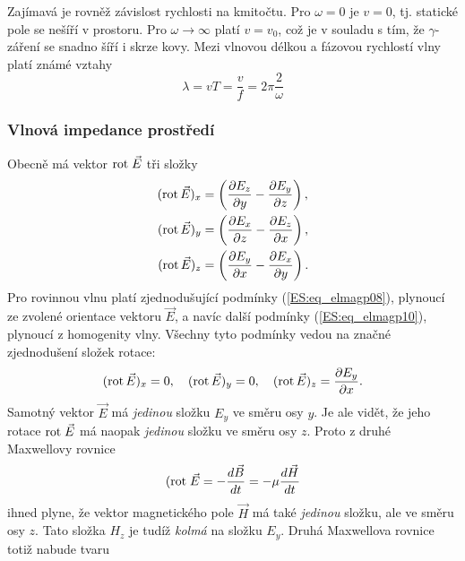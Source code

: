 {        Zajímavá je rovněž závislost rychlosti na kmitočtu. Pro \(\omega = 0\) je \(v = 0\), tj. 
        statické pole se nešíří v prostoru. Pro \(\omega\rightarrow\infty\) platí \(v = v_0\), 
        což je v souladu s tím, že \(\gamma\)-záření se snadno šíří i skrze kovy. Mezi vlnovou 
        délkou a fázovou rychlostí vlny platí známé vztahy
        \begin{equation}\label{ES:eq_elmagp21}
          \lambda = vT = \frac{v}{f} = 2\pi\frac{2}{\omega}
        \end{equation}

      \subsubsection{Vlnová impedance prostředí}
        Obecně má vektor \(\mathrm{rot}\;\vec{E}\) tři složky
        \begin{align}
          (\text{rot}\,\vec{E})_x &=\left(\dfrac{\partial E_z}{\partial y}-\dfrac{\partial E_y}{\partial z}\right), \nonumber \\
          (\text{rot}\,\vec{E})_y &=\left(\dfrac{\partial E_x}{\partial z}-\dfrac{\partial E_z}{\partial x}\right), \nonumber \\
          (\text{rot}\,\vec{E})_z &=\left(\dfrac{\partial E_y}{\partial x}-\dfrac{\partial E_x}{\partial y}\right). \label{ES:eq_elmagp22}
        \end{align}
        Pro rovinnou vlnu platí zjednodušující podmínky (\ref{ES:eq_elmagp08}), plynoucí ze zvolené 
        orientace vektoru \(\vec{E}\), a navíc další podmínky (\ref{ES:eq_elmagp10}), plynoucí z 
        homogenity vlny. Všechny tyto podmínky vedou na značné zjednodušení složek rotace:
        \begin{equation}\label{ES:eq_elmagp23}
          (\text{rot}\,\vec{E})_x = 0, \quad
          (\text{rot}\,\vec{E})_y = 0, \quad
          (\text{rot}\,\vec{E})_z = \dfrac{\partial E_y}{\partial x}.
        \end{equation}
        Samotný vektor \(\vec{E}\) má \emph{jedinou} složku \(E_y\) ve směru osy \(y\). Je ale 
        vidět, že jeho rotace \(\mathrm{rot}\;\vec{E}\) má naopak \emph{jedinou} složku ve směru osy \(z\). Proto 
        z druhé Maxwellovy rovnice
        \begin{equation}\label{ES:eq_elmagp24}
          (\mathrm{rot}\;\vec{E} = -\dfrac{d \vec{B}}{d t} = -\mu\dfrac{d \vec{H}}{d t}
        \end{equation}
        ihned plyne, že vektor magnetického pole \(\vec{H}\) má také \emph{jedinou} složku, ale ve 
        směru osy \(z\). Tato složka \(H_z\) je tudíž \emph{kolmá} na složku \(E_y\). Druhá 
        Maxwellova rovnice totiž nabude tvaru
}
